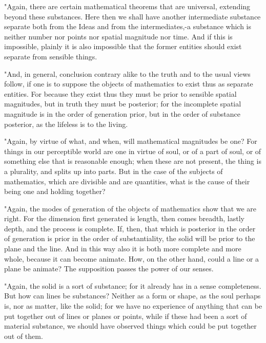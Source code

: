 "Again, there are certain mathematical theorems that are universal,
extending beyond these substances. Here then we shall have another
intermediate substance separate both from the Ideas and from the intermediates,-a
substance which is neither number nor points nor spatial magnitude
nor time. And if this is impossible, plainly it is also impossible
that the former entities should exist separate from sensible things.

"And, in general, conclusion contrary alike to the truth and to the
usual views follow, if one is to suppose the objects of mathematics
to exist thus as separate entities. For because they exist thus they
must be prior to sensible spatial magnitudes, but in truth they must
be posterior; for the incomplete spatial magnitude is in the order
of generation prior, but in the order of substance posterior, as the
lifeless is to the living. 

"Again, by virtue of what, and when, will mathematical magnitudes
be one? For things in our perceptible world are one in virtue of soul,
or of a part of soul, or of something else that is reasonable enough;
when these are not present, the thing is a plurality, and splits up
into parts. But in the case of the subjects of mathematics, which
are divisible and are quantities, what is the cause of their being
one and holding together? 

"Again, the modes of generation of the objects of mathematics show
that we are right. For the dimension first generated is length, then
comes breadth, lastly depth, and the process is complete. If, then,
that which is posterior in the order of generation is prior in the
order of substantiality, the solid will be prior to the plane and
the line. And in this way also it is both more complete and more whole,
because it can become animate. How, on the other hand, could a line
or a plane be animate? The supposition passes the power of our senses.

"Again, the solid is a sort of substance; for it already has in a
sense completeness. But how can lines be substances? Neither as a
form or shape, as the soul perhaps is, nor as matter, like the solid;
for we have no experience of anything that can be put together out
of lines or planes or points, while if these had been a sort of material
substance, we should have observed things which could be put together
out of them. 


